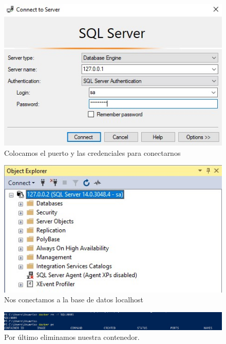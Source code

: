 \documentclass[preprint,12pt]{elsarticle}
\begin{document}
\begin{figure}[H]
	\begin{center}
		\includegraphics[width=12cm]{./IMAGENES/foto13} 
		\caption{Colocamos el puerto y las credenciales para conectarnos}
	\end{center}
\end{figure}

\begin{figure}[H]
	\begin{center}
		\includegraphics[width=12cm]{./IMAGENES/foto14} 
		\caption{Nos conectamos a la base de datos localhost}
	\end{center}
\end{figure}

\begin{figure}[H]
	\begin{center}
		\includegraphics[width=12cm]{./IMAGENES/foto17} 
		\caption{Por último eliminamos nuestra contenedor.}
	\end{center}
\end{figure}
\end{document}
